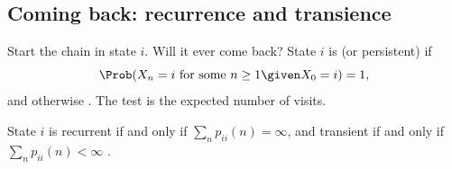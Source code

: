 \subsection{Coming back: recurrence and transience}
\label{9a:sec:recurrence}

Start the chain in state $i$. Will it ever come back? State $i$ is  (or
persistent) if
\begin{equation*}
  \Prob(X_n=i\text{ for some }n\ge1\given X_0=i)=1,
\end{equation*}
and  otherwise . The test is the expected number of visits.

\begin{keyidea}
State $i$ is recurrent if and only if $\sum_{n}p_{ii}(n)=\infty$, and transient if and only
if $\sum_np_{ii}(n)<\infty$ .
\end{keyidea}

